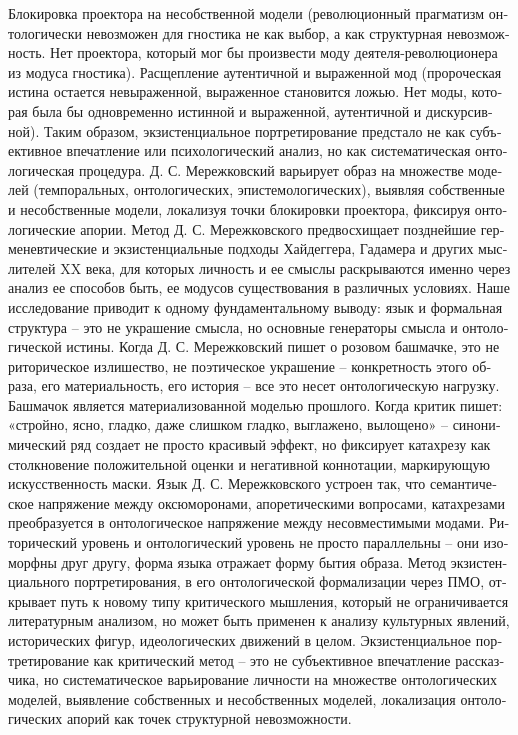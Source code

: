 \begin{russian}
    Блокировка проектора на несобственной модели (революционный прагматизм онтологически невозможен для гностика не как выбор, а как структурная невозможность. Нет проектора, который мог бы произвести моду деятеля-революционера из модуса гностика).
    Расщепление аутентичной и выраженной мод (пророческая истина остается невыраженной, выраженное становится ложью. Нет моды, которая была бы одновременно истинной и выраженной, аутентичной и дискурсивной).
    Таким образом, экзистенциальное портретирование предстало не как субъективное впечатление или психологический анализ, но как систематическая онтологическая процедура. Д. С. Мережковский варьирует образ на множестве моделей (темпоральных, онтологических, эпистемологических), выявляя собственные и несобственные модели, локализуя точки блокировки проектора, фиксируя онтологические апории. Метод Д. С. Мережковского предвосхищает позднейшие герменевтические и экзистенциальные подходы Хайдеггера, Гадамера и других мыслителей XX века, для которых личность и ее смыслы раскрываются именно через анализ ее способов быть, ее модусов существования в различных условиях.
    Наше исследование приводит к одному фундаментальному выводу: язык и формальная структура – это не украшение смысла, но основные генераторы смысла и онтологической истины.
    Когда Д. С. Мережковский пишет о розовом башмачке, это не риторическое излишество, не поэтическое украшение – конкретность этого образа, его материальность, его история – все это несет онтологическую нагрузку. Башмачок является материализованной моделью прошлого. Когда критик пишет: «стройно, ясно, гладко, даже слишком гладко, выглажено, вылощено» – синонимический ряд создает не просто красивый эффект, но фиксирует катахрезу как столкновение положительной оценки и негативной коннотации, маркирующую искусственность маски.
    Язык Д. С. Мережковского устроен так, что семантическое напряжение между оксюморонами, апоретическими вопросами, катахрезами преобразуется в онтологическое напряжение между несовместимыми модами. Риторический уровень и онтологический уровень не просто параллельны – они изоморфны друг другу, форма языка отражает форму бытия образа.
    Метод экзистенциального портретирования, в его онтологической формализации через ПМО, открывает путь к новому типу критического мышления, который не ограничивается литературным анализом, но может быть применен к анализу культурных явлений, исторических фигур, идеологических движений в целом.  Экзистенциальное портретирование как критический метод – это не субъективное впечатление рассказчика, но систематическое варьирование личности на множестве онтологических моделей, выявление собственных и несобственных моделей, локализация онтологических апорий как точек структурной невозможности.

\end{russian}
